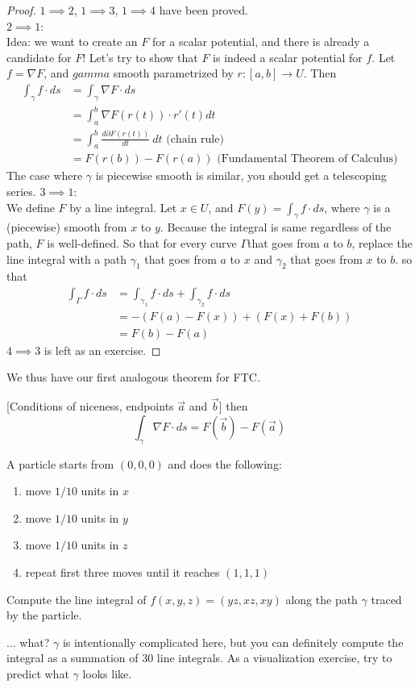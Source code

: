 \documentclass[11pt,openany]{book}
\newcommand{\theorem}[2]{\begin{tcolorbox}[title=Theorem ({#1}),colframe=red!70!black,colback=red!5!white]{#2}\end{tcolorbox}
}
\newcommand{\example}[1]{\begin{tcolorbox}[title=Example,colframe=yellow!50!white,colback=yellow!20!white,coltitle=black]{#1}\end{tcolorbox}
}
\begin{document}
	\begin{proof}
		$1 \implies 2$, $1 \implies 3$, $1 \implies 4$ have been proved.\\
		$2 \implies 1$:\\
		Idea: we want to create an $F$ for a scalar potential, and there is already a candidate for $F$!
		Let's try to show that $F$ is indeed a scalar potential for $f$.
		Let $f=\nabla F$, and $gamma$ smooth parametrized by $r:[a,b]\to U$. Then
		\begin{align*}
			\int_\gamma f \cdot ds &= \int_\gamma \nabla F \cdot ds \\
			&= \int_a^b \nabla F(r(t)) \cdot r'(t) dt \\
			&= \int_a^b \frac{d \partial F(r(t))}{dt} \ dt \textrm{ (chain rule)}\\
			&= F(r(b)) - F(r(a)) \textrm{ (Fundamental Theorem of Calculus)}
		\end{align*} 
		The case where $\gamma$ is piecewise smooth is similar, you should get a telescoping series.
		$3 \implies 1$:\\
		We define $F$ by a line integral.
		Let $x \in U$, and $F(y) = \int_\gamma f \cdot ds$, where $\gamma$ is a (piecewise) smooth from $x$ to $y$.
		Because the integral is same regardless of the path, $F$ is well-defined.
		So that for every curve $\Gamma$that goes from $a$ to $b$, replace the line integral with a path $\gamma_1$ that goes from $a$ to $x$
		and $\gamma_2$ that goes from $x$ to $b$.
		so that \begin{align*}
			\int_\Gamma f\cdot ds &= \int_{\gamma_1} f\cdot ds + \int_{\gamma_2} f\cdot ds \\
			&= - (F(a) - F(x) ) + (F(x) + F(b))\\
			&= F(b) - F(a)
		\end{align*}
		$4 \implies 3$ is left as an exercise. 
	\end{proof}
	
	We thus have our first analogous theorem for FTC.
	\theorem{Gradient}{
		[Conditions of niceness, endpoints $\vec{a}$ and $\vec{b}$]
		then \[
			\int_\gamma \nabla F \cdot ds = F(\vec{b})-F(\vec{a})
		\]
	}
	\example{
	A particle starts from $(0,0,0)$ and does the following:
	\begin{enumerate}
		\item move $1/10$ units in $x$
		\item move $1/10$ units in $y$
		\item move $1/10$ units in $z$
		\item repeat first three moves until it reaches $(1,1,1)$
	\end{enumerate}
	Compute the line integral of $f(x,y,z)= (yz,xz,xy)$ along the path $\gamma$ traced by the particle.
	}
	... what? $\gamma$ is intentionally complicated here, but you can definitely compute the integral as a summation of $30$ line integrals.
	As a visualization exercise, try to predict what $\gamma$ looks like.
	
\end{document}
